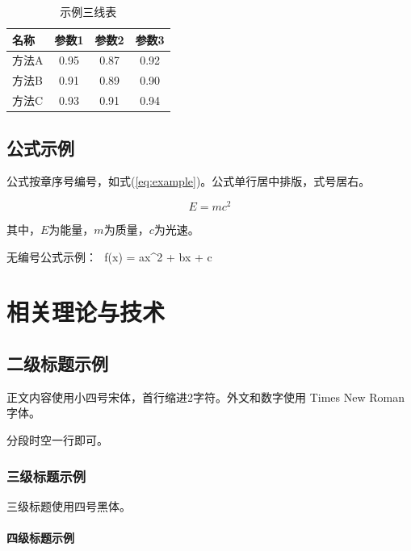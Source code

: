 \begin{table}[htbp]
    \centering
    \caption{示例三线表}
    \label{tab:example}
    \begin{tabular}{lccc}
        \toprule
        名称 & 参数1 & 参数2 & 参数3 \\
        \midrule
        方法A & 0.95 & 0.87 & 0.92 \\
        方法B & 0.91 & 0.89 & 0.90 \\
        方法C & 0.93 & 0.91 & 0.94 \\
        \bottomrule
    \end{tabular}
\end{table}

\section{公式示例}

公式按章序号编号，如式(\ref{eq:example})。公式单行居中排版，式号居右。

\begin{equation}
    E = mc^2
    \label{eq:example}
\end{equation}

其中，$E$为能量，$m$为质量，$c$为光速。

无编号公式示例：
$$
f(x) = ax^2 + bx + c\chapter{相关理论与技术}


\section{二级标题示例}

正文内容使用小四号宋体，首行缩进2字符。外文和数字使用 Times New Roman 字体。

分段时空一行即可。

\subsection{三级标题示例}

三级标题使用四号黑体。

\subsubsection{四级标题示例}

